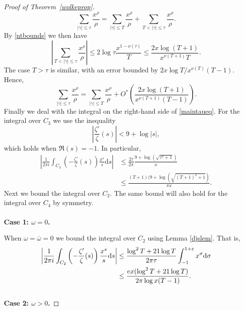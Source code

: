 \documentclass[reqno]{amsart}
\numberwithin{equation}{section}
\theoremstyle{remark}
\begin{document}
\begin{proof}[Proof of Theorem~\ref{wolkeprop}]
\begin{equation*}
    \sum_{|\gamma|\leq\tau}\frac{x^{\rho}}{\rho}=\sum_{|\gamma|\leq  T}\frac{x^{\rho}}{\rho}+\sum_{T<|\gamma|\leq \tau}\frac{x^{\rho}}{\rho}.
\end{equation*}
By \eqref{ntbounds} we then have
\begin{equation*}
    \left|\sum_{T<|\gamma|\leq \tau}\frac{x^{\rho}}{\rho}\right|\leq 2\log \tau\frac{x^{1-\nu(\tau)}}{T}\leq \frac{2x\log (T+1)}{x^{\nu(T+1)}T}.
\end{equation*} 
The case $T>\tau$ is similar, with an error bounded by $2x\log T/x^{\nu(T)}(T-1)$. Hence, 
\begin{equation}\label{minitoughterm}
    \sum_{|\gamma|\leq\tau}\frac{x^{\rho}}{\rho}=\sum_{|\gamma|\leq  T}\frac{x^{\rho}}{\rho}+O^*\left(\frac{2x\log (T+1)}{x^{\nu(T+1)}(T-1)}\right).
\end{equation}
Finally we deal with the integral on the right-hand side of \eqref{maintaueq}. For the integral over $C_3$ we use the inequality \cite[Lemma 2.3]{Dudek_16p}
\begin{equation*}
    \left|\frac{\zeta'}{\zeta}(s)\right|<9+\log|s|,
\end{equation*}
which holds when $\Re(s)=-1$. In particular, 
\begin{align*}
    \left|\frac{1}{2\pi i}\int_{C_3}\left(-\frac{\zeta'}{
    \zeta}(s)\right)\frac{x^s}{s}\mathrm{d}s\right|&\leq\frac{2\tau}{2\pi }\frac{9+\log(\sqrt{\tau^2+1})}{x}\\
    &\leq\frac{(T+1)(9+\log(\sqrt{(T+1)^2+1})}{\pi x}.
\end{align*}
Next we bound the integral over $C_2$. The same bound will also hold for the integral over $C_4$ by symmetry.\\
\\
\textbf{Case 1: $\omega=0$.}

When $\omega=\overline{\omega}=0$ we bound the integral over $C_2$ using Lemma \ref{djslem}. That is,
\begin{align}\label{omegazero}
    \left|\frac{1}{2\pi i}\int_{C_2}\left(-\frac{\zeta'}{\zeta}(s)\right)\frac{x^s}{s}\mathrm{d}s\right|&\leq\frac{\log^2T+21\log T}{2\pi\tau}\int_{-1}^{1+\varepsilon}x^\sigma\mathrm{d}\sigma\notag\notag\\
    &\leq\frac{ex(\log^2T+21\log T)}{2\pi\log x(T-1)}.
\end{align}
\ \\
\textbf{Case 2: $\omega>0$.}


\end{proof}
\end{document}
